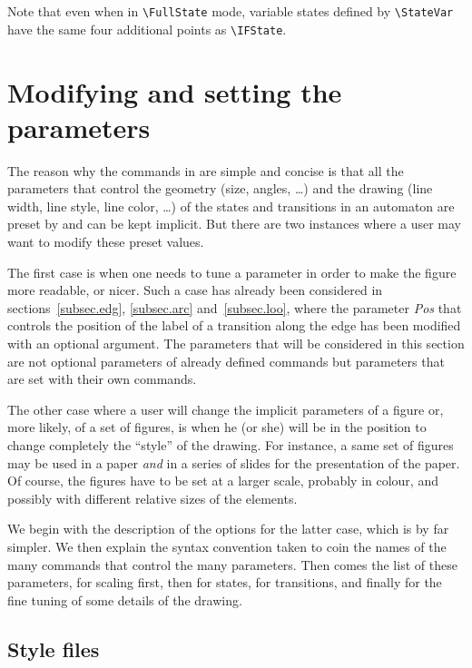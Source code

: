 \documentclass[11pt,twoside]{article}
\begin{document}
Note that even when in \verb+\FullState+ mode, 
variable states defined by \verb+\StateVar+ have
 the same four additional points as \verb+\IFState+.


\section{Modifying and setting the parameters}\label{sec.mod}

The reason why the commands in \VCSG are simple and concise is that 
all the parameters that control the geometry (size, angles, 
\ldots) and the drawing (line width, line style, line color, \ldots) 
of the states and transitions in an automaton are preset by \VCSG and 
can be kept implicit.
But there are two instances where a user may want to modify these 
preset values.

The first case is when one needs to tune a parameter in order to make 
the figure more readable, or nicer. 
Such a case has already been considered in 
sections~\ref{subsec.edg}, \ref{subsec.arc} and~\ref{subsec.loo}, 
where the parameter \textsl{Pos}   
that controls the position of the label of a transition along the 
edge has been modified with an optional argument. 
The parameters that will be considered in this section are not 
optional parameters of already defined commands but parameters that 
are set with their own commands.

The other case where a user will change the implicit parameters of 
a figure or, more likely, of a set of figures, is when he (or she) 
will be in the position to change completely the ``style'' of the 
drawing.
For instance, a same set of figures may be used in a paper \emph{and} in a 
series of slides for the presentation of the paper.
Of course, the figures have to be set at a larger scale, probably 
in colour, and possibly with different relative sizes of the elements.

We begin with the description of the options for the latter case, 
which is by far simpler. We then explain the syntax convention taken 
to coin the names of the many commands that control the many 
parameters.
Then comes the list of these parameters, for scaling first, then for 
states, for transitions, and finally for the fine tuning of 
some details of the drawing.

\subsection{Style files}\label{sec.sty-fil}
\end{document}
